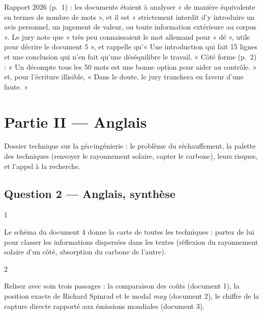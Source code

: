 \documentclass[11pt,a4paper]{article}
\begin{document}
\begin{jury}

Rapport 2026 (p.~1) : les documents étaient à analyser « de manière équivalente en termes de nombre de mots », et il est « strictement interdit d'y introduire un avis personnel, un jugement de valeur, ou toute information extérieure au corpus ». Le jury note que « très peu connaissaient le mot allemand pour « dé », utile pour décrire le document 5 », et rappelle qu'« Une introduction qui fait 15 lignes et une conclusion qui n'en fait qu'une déséquilibre le travail. » Côté forme (p.~2) : « Un décompte tous les 50 mots est une bonne option pour aider au contrôle. » et, pour l'écriture illisible, « Dans le doute, le jury tranchera en faveur d'une faute. »

\end{jury}

\hypertarget{partie-ii-anglais}{%
\section{Partie II --- Anglais}\label{partie-ii-anglais}}

Dossier technique sur la géo-ingénierie : le problème du réchauffement, la palette des techniques (renvoyer le rayonnement solaire, capter le carbone), leurs risques, et l'appel à la recherche.

\hypertarget{question-2-anglais-synthuxe8se}{%
\subsection{Question 2 --- Anglais, synthèse}\label{question-2-anglais-synthuxe8se}}

\begin{indication}{1}

Le schéma du document 4 donne la carte de toutes les techniques : partez de lui pour classer les informations dispersées dans les textes (réflexion du rayonnement solaire d'un côté, absorption du carbone de l'autre).

\end{indication}

\begin{indication}{2}

Relisez avec soin trois passages : la comparaison des coûts (document 1), la position exacte de Richard Spinrad et le modal \emph{may} (document 2), le chiffre de la capture directe rapporté aux émissions mondiales (document 3).

\end{indication}
\end{document}

